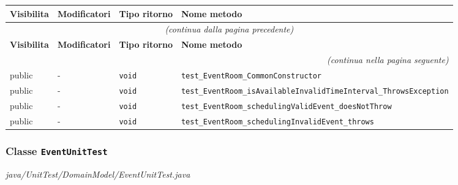 \begin{longtable}{@{}llll@{}}
\toprule
\textbf{Visibilita} & \textbf{Modificatori} & \textbf{Tipo ritorno} & \textbf{Nome metodo} \\
\midrule
\endfirsthead
\multicolumn{4}{c}{\small\itshape (continua dalla pagina precedente)} \\
\toprule
\textbf{Visibilita} & \textbf{Modificatori} & \textbf{Tipo ritorno} & \textbf{Nome metodo} \\
\midrule
\endhead
\midrule
\multicolumn{4}{r}{\small\itshape (continua nella pagina seguente)} \\
\endfoot
\bottomrule
\endlastfoot
  public & - & \texttt{void} & \texttt{test\_EventRoom\_CommonConstructor} \\
  public & - & \texttt{void} & \texttt{test\_EventRoom\_isAvailableInvalidTimeInterval\_ThrowsException} \\
  public & - & \texttt{void} & \texttt{test\_EventRoom\_schedulingValidEvent\_doesNotThrow} \\
  public & - & \texttt{void} & \texttt{test\_EventRoom\_schedulingInvalidEvent\_throws} \\
\end{longtable}

\subsubsection*{Classe \texttt{EventUnitTest}}\label{EventUnitTest}
{\small\textit{java/UnitTest/DomainModel/EventUnitTest.java}}
\vspace{4pt}

